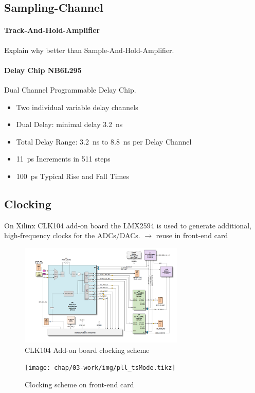 \subsection{Sampling-Channel}
\paragraph{Track-And-Hold-Amplifier}
Explain why better than Sample-And-Hold-Amplifier.
\paragraph{Delay Chip NB6L295}
Dual Channel Programmable Delay Chip.

\begin{itemize}[noitemsep]
	\item Two individual variable delay channels
	\item Dual Delay: minimal delay \SI{3.2}{\nano \second}
	\item Total Delay Range: \SI{3.2}{\nano \second} to \SI{8.8}{\nano \second} per Delay Channel
	\item \SI{11}{\pico \second} Increments in 511 steps
	\item \SI{100}{\pico \second} Typical Rise and Fall Times
\end{itemize}

\subsection{Clocking}
On Xilinx CLK104 add-on board the LMX2594 is used to generate additional, high-frequency clocks for the ADCs/DACs. $\rightarrow$ reuse in front-end card
\begin{figure}[H]
	\centering
	\includegraphics[width = 0.7\textwidth]{chap/03-work/img/clk104}
	\caption{CLK104 Add-on board clocking scheme}
	\label{fig:clk104}
\end{figure}

\begin{figure}[H]
	\centering
	\texttt{[image: chap/03-work/img/pll\_tsMode.tikz]}
	\caption{Clocking scheme on front-end card}
	\label{fig:clocking}
\end{figure}


